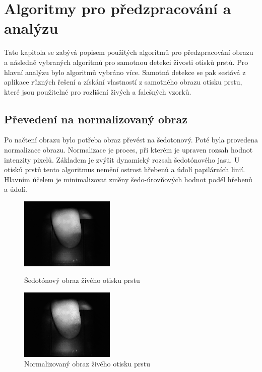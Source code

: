 \chapter{Algoritmy pro předzpracování a analýzu}
Tato kapitola se zabývá popisem použitých algoritmů pro předzpracování obrazu a následně vybraných algoritmů pro samotnou detekci živosti otisků prstů. Pro hlavní analýzu bylo algoritmů vybráno více. Samotná detekce se pak sestává z aplikace různých řešení a získání vlastností z samotného obrazu otisku prstu, které jsou použitelné pro rozlišení živých a falešných vzorků.
\section{Převedení na normalizovaný obraz}
Po načtení obrazu bylo potřeba obraz převést na šedotonový. Poté byla provedena normalizace obrazu. Normalizace je proces, při kterém je upraven rozsah hodnot intenzity pixelů. Základem je zvýšit dynamický rozsah šedotónového jasu. U otisků prstů tento algoritmus nemění ostrost hřebenů a údolí papilárních linií. Hlavním účelem je minimalizovat změny šedo-úrovňových hodnot podél hřebenů a údolí. 

\begin{figure}[htbp]
  \begin{minipage}[b]{0.5\linewidth}
    \centering
    \includegraphics[width=170px]{obrazky-figures/live87grayscale.png}
    \caption{Šedotónový obraz živého otisku prstu}
  \end{minipage}
  \hspace{0.5cm}
  \begin{minipage}[b]{0.5\linewidth}
    \centering
    \includegraphics[width=170px]{obrazky-figures/live87norm.png}
    \caption{Normalizovaný obraz živého otisku prstu}
  \end{minipage}
\end{figure}



